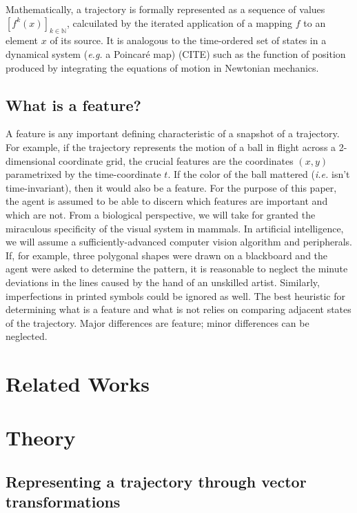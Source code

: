 \documentclass{article}
\begin{document}
Mathematically, a trajectory is formally represented as a sequence of values $\left[ f^k(x) \right]_{k \in \mathbb{N}}$,
calcuilated by the iterated application of a mapping $f$ to an element $x$ of its source.
It is analogous to the time-ordered set of states in a dynamical system (\textit{e.g.} a Poincar\'e map) (CITE)
such as the function of position produced by integrating the equations of motion in Newtonian mechanics.

\subsection{What is a feature?}

A feature is any important defining characteristic of a snapshot of a trajectory.
For example, if the trajectory represents the motion of a ball in flight across a 2-dimensional coordinate grid,
the crucial features are the coordinates $(x, y)$ parametrixed by the time-coordinate $t$.
If the color of the ball mattered (\textit{i.e.} isn't time-invariant), then it would also be a feature.
For the purpose of this paper, the agent is assumed to be able to discern which features are important and which are not.
From a biological perspective, we will take for granted the miraculous specificity of the visual system in mammals.
In artificial intelligence, we will assume a sufficiently-advanced computer vision algorithm and peripherals.
If, for example, three polygonal shapes were drawn on a blackboard and the agent were asked to determine the pattern,
it is reasonable to neglect the minute deviations in the lines caused by the hand of an unskilled artist.
Similarly, imperfections in printed symbols could be ignored as well.
The best heuristic for determining what is a feature and what is not relies on comparing adjacent states of the trajectory.
Major differences are feature; minor differences can be neglected.

\section{Related Works}

\section{Theory}

\subsection{Representing a trajectory through vector transformations}
\label{sec:vectorrepresentation}
\end{document}
